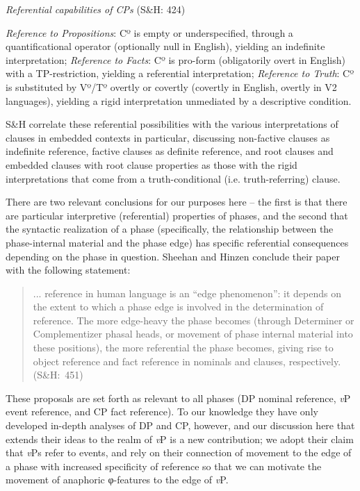 \documentclass[output=paper
,modfonts
,nonflat
]{langsci/langscibook}
\begin{document}
\ea \textit{Referential capabilities of CPs} (S\&H: 424)\\
\begin{xlist}
\ex \textit{Reference to Propositions}: Cº is empty or underspecified, through a quantificational operator (optionally null in English), yielding an indefinite interpretation; 
\ex \textit{Reference to Facts}: Cº is pro-form (obligatorily overt in English) with a TP-restriction, yielding a referential interpretation;
\ex \textit{Reference to Truth}: Cº is substituted by Vº/Tº overtly or covertly (covertly in English, overtly in V2 languages), yielding a rigid interpretation unmediated by a descriptive condition.
\end{xlist}
\z
\noindent S\&H correlate these referential possibilities with the various interpretations of clauses in embedded contexts in particular, discussing non-factive clauses as indefinite reference, factive clauses as definite reference, and root clauses and embedded clauses with root clause properties as those with the rigid interpretations that come from a truth-conditional (i.e. truth-referring) clause. 

There are two relevant conclusions for our purposes here -- the first is that there are particular interpretive (referential) properties of phases, and the second that the syntactic realization of a phase (specifically, the relationship between the phase-internal material and the phase edge) has specific referential consequences depending on the phase in question. Sheehan and Hinzen conclude their paper with the following statement: 

\begin{quote}
 ... reference in human language is an ``edge phenomenon'': it depends on the extent to which a phase edge is involved in the determination of reference. The more edge-heavy the phase becomes (through Determiner or Complementizer phasal heads, or movement of phase internal material into these positions), the more referential the phase becomes, giving rise to object reference and fact reference in nominals and clauses, respectively.\hbox{}\hfill\hbox{(S\&H: 451)}\end{quote}
\noindent 
These proposals are set forth as relevant to all phases (DP nominal reference, \textit{v}P event reference, and CP fact reference).  To our knowledge they have only developed in-depth analyses of DP and CP, however, and our discussion here that extends their ideas to the realm of \textit{v}P is a new contribution; we adopt their claim that \textit{v}Ps refer to events, and rely on their connection of movement to the edge of a phase with increased specificity of reference so that we can motivate the movement of anaphoric φ-features to the edge of \textit{v}P. 
\end{document}
